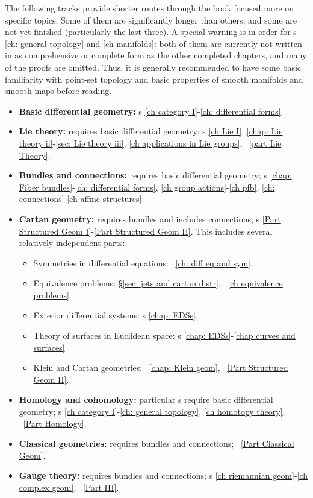 The following tracks provide shorter routes through the book focused more on specific topics. Some of them are significantly longer than others, and some are not yet finished (particularly the last three). A special warning is in order for \Chap s \ref{ch: general topology} and \ref{ch manifolds}: both of them are currently not written in as comprehensive or complete form as the other completed chapters, and many of the proofs are omitted. Thus, it is generally recommended to have some basic familiarity with point-set topology and basic properties of smooth manifolds and smooth maps before reading.

\begin{itemize}
    \item \textbf{Basic differential geometry:} \Chap s \ref{ch category I}-\ref{ch: differential forms}.
    \item \textbf{Lie theory:} requires basic differential geometry; \Chap s \ref{ch Lie I}, \ref{chap: Lie theory ii}-\ref{sec: Lie theory iii}, \ref{ch applications in Lie groups}, \Part~\ref{part Lie Theory}.
    \item \textbf{Bundles and connections:} requires basic differential geometry; \Chap s \ref{chap: Fiber bundles}-\ref{ch: differential forms}, \ref{ch group actions}-\ref{ch pfb}, \ref{ch: connections}-\ref{ch affine structures}.
    \item \textbf{Cartan geometry:} requires bundles and includes connections; \Part s \ref{Part Structured Geom I}-\ref{Part Structured Geom II}. This includes several relatively independent parts:
        \begin{itemize}
            \item Symmetries in differential equations: \Chap~\ref{ch: diff eq and sym}.
            \item Equivalence problems: \S\ref{sec: jets and cartan distr}, \Chap~\ref{ch equivalence problems}.
            \item Exterior differential systems: \Chap s \ref{chap: EDSs}.
            \item Theory of surfaces in Euclidean space: \Chap s \ref{chap: EDSs}-\ref{chap curves and surfaces}
            \item Klein and Cartan geometries: \Chap~\ref{chap: Klein geom}, \Part~\ref{Part Structured Geom II}.
        \end{itemize}
    \item \textbf{Homology and cohomology:} particular \chap s require basic differential geometry; \Chap s \ref{ch category I}-\ref{ch: general topology}, \ref{ch homotopy theory}, \Part~\ref{Part Homology}.
    \item \textbf{Classical geometries:} requires bundles and connections; \Part~\ref{Part Classical Geom}.
    \item \textbf{Gauge theory:} requires bundles and connections; \Chap s \ref{ch riemannian geom}-\ref{ch complex geom}, \Part~\ref{Part III}.
\end{itemize}